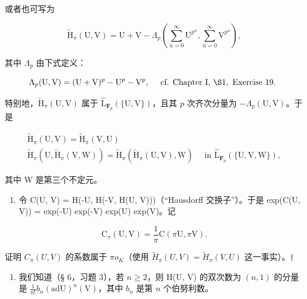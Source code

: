 或者也可写为

\[
\tilde {\mathrm{H}} _ {\pi} (\mathrm{U}, \mathrm{V}) = \mathrm{U} + \mathrm{V} - \Lambda_ {p} \left(\sum_ {n = 0} ^ {\infty} \mathrm{U} ^ {p ^ {n}}, \sum_ {n = 0} ^ {\infty} \mathrm{V} ^ {p ^ {n}}\right),
\]

其中 \(\Lambda_{p}\) 由下式定义：

\[
\Lambda_ {p} (\mathrm{U}, \mathrm{V}) = (\mathrm{U} + \mathrm{V}) ^ {p} - \mathrm{U} ^ {p} - \mathrm{V} ^ {p}, \quad \text { cf.   Chapter   I,   } \S 1, \text {   Exercise   19. }
\]

特别地，\(\tilde{\mathrm{H}}_{\pi}(\mathrm{U},\mathrm{V})\) 属于 \(\hat{\mathrm{L}}_{\mathbf{F}_{p}}(\{\mathrm{U},\mathrm{V}\})\)，且其 \(p\) 次齐次分量为 \(-\Lambda_p(\mathrm{U},\mathrm{V})\)。于是

\[
\begin{array}{c} \tilde {\mathrm{H}} _ {\pi} (\mathrm{U}, \mathrm{V}) = \tilde {\mathrm{H}} _ {\pi} (\mathrm{V}, \mathrm{U}) \\ \tilde {\mathrm{H}} _ {\pi} (\mathrm{U}, \tilde {\mathrm{H}} _ {\pi} (\mathrm{V}, \mathrm{W})) = \tilde {\mathrm{H}} _ {\pi} (\tilde {\mathrm{H}} _ {\pi} (\mathrm{U}, \mathrm{V}), \mathrm{W}) \quad \text { in } \hat {\mathrm{L}} _ {\mathbf {F} _ {p}} (\{\mathrm{U}, \mathrm{V}, \mathrm{W} \}), \end{array}
\]

其中 W 是第三个不定元。

\begin{enumerate}
\def\labelenumi{(\alph{enumi})}
\setcounter{enumi}{4}
\tightlist
\item
  令 C(U, V) = H(-U, H(-V, H(U, V)))（“Hausdorff 交换子”）。于是 exp(C(U, V)) = exp(-U) exp(-V) exp(U) exp(V)。记
\end{enumerate}

\[
\mathrm{C} _ {\pi} (\mathrm{U}, \mathrm{V}) = \frac {1}{\pi} \mathrm{C} (\pi \mathrm{U}, \pi \mathrm{V}).
\]

证明 \(C_{\pi}(U,V)\) 的系数属于 \(\pi o_{K}\)（使用 \(\tilde{H}_{\pi}(U,V)=\tilde{H}_{\pi}(V,U)\) 这一事实）。†

\begin{enumerate}
\def\labelenumi{\arabic{enumi}.}
\setcounter{enumi}{1}
\tightlist
\item
  我们知道（§ 6，习题 3），若 \(n \geqslant 2\)，则 H(U, V) 的双次数为 \((n, 1)\) 的分量是 \(\frac{1}{n!} b_n(\mathrm{ad}\mathrm{U})^n (\mathrm{V})\)，其中 \(b_n\) 是第 \(n\) 个伯努利数。
\end{enumerate}

